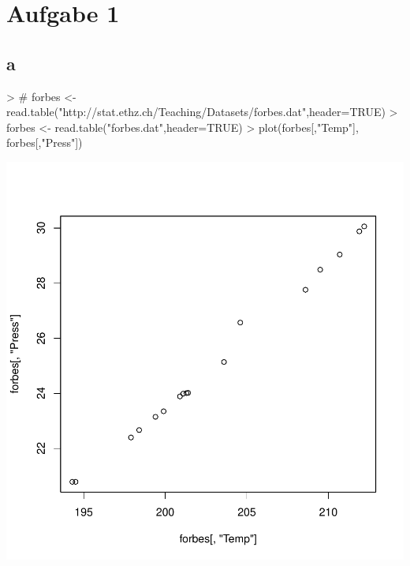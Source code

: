 
\section{Aufgabe 1}

\subsection{a}
\begin{Schunk}
\begin{Sinput}
> # forbes <- read.table("http://stat.ethz.ch/Teaching/Datasets/forbes.dat",header=TRUE)
> forbes <- read.table("forbes.dat",header=TRUE)
> plot(forbes[,"Temp"], forbes[,"Press"])
\end{Sinput}
\end{Schunk}
\includegraphics{sw12_1-001}

